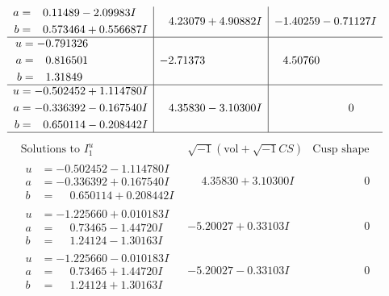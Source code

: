 \documentclass[1p]{elsarticle_modified}
\theoremstyle{definition}
\newcommand{\I}{\sqrt{-1}}
\begin{document}
$$\begin{array}{c|c|c}
\begin{aligned}
a &= \phantom{-}0.11489 - 2.09983 I \\
b &= \phantom{-}0.573464 + 0.556687 I\end{aligned}
 & \phantom{-}4.23079 + 4.90882 I & -1.40259 - 0.71127 I \\ \hline\begin{aligned}
u &= -0.791326\phantom{ +0.000000I} \\
a &= \phantom{-}0.816501\phantom{ +0.000000I} \\
b &= \phantom{-}1.31849\phantom{ +0.000000I}\end{aligned}
 & -2.71373\phantom{ +0.000000I} & \phantom{-}4.50760\phantom{ +0.000000I} \\ \hline\begin{aligned}
u &= -0.502452 + 1.114780 I \\
a &= -0.336392 - 0.167540 I \\
b &= \phantom{-}0.650114 - 0.208442 I\end{aligned}
 & \phantom{-}4.35830 - 3.10300 I & \phantom{-0.000000 } 0\\
 \hline 
 \end{array}$$\newpage$$\begin{array}{c|c|c}  
\text{Solutions to }I^u_{1}& \I (\text{vol} + \sqrt{-1}CS) & \text{Cusp shape}\\
 \hline 
\begin{aligned}
u &= -0.502452 - 1.114780 I \\
a &= -0.336392 + 0.167540 I \\
b &= \phantom{-}0.650114 + 0.208442 I\end{aligned}
 & \phantom{-}4.35830 + 3.10300 I & \phantom{-0.000000 } 0 \\ \hline\begin{aligned}
u &= -1.225660 + 0.010183 I \\
a &= \phantom{-}0.73465 - 1.44720 I \\
b &= \phantom{-}1.24124 - 1.30163 I\end{aligned}
 & -5.20027 + 0.33103 I & \phantom{-0.000000 } 0 \\ \hline\begin{aligned}
u &= -1.225660 - 0.010183 I \\
a &= \phantom{-}0.73465 + 1.44720 I \\
b &= \phantom{-}1.24124 + 1.30163 I\end{aligned}
 & -5.20027 - 0.33103 I & \phantom{-0.000000 } 0 \\ \hline\begin{aligned}

\end{aligned}
\end{array}$$
\end{document}
